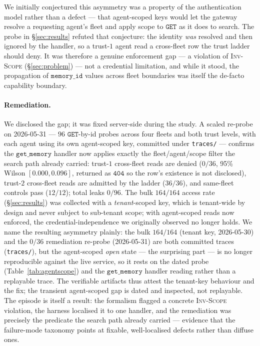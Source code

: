 \documentclass[10pt,twocolumn,letterpaper]{article}
\begin{document}
We initially conjectured this asymmetry was a property of the authentication model rather than a defect --- that agent-scoped keys would let the gateway resolve a requesting agent's fleet and apply scope to \(\mathtt{GET}\) as it does to search. The probe in \S\ref{sec:results} refuted that conjecture: the identity \emph{was} resolved and then ignored by the handler, so a trust-\(1\) agent read a cross-fleet row the trust ladder should deny. It was therefore a genuine enforcement gap --- a violation of \textsc{Inv-Scope} (\S\ref{sec:problem}) --- not a credential limitation, and while it stood, the propagation of \(\mathtt{memory\_id}\) values across fleet boundaries was itself the de-facto capability boundary.

\paragraph{Remediation.} We disclosed the gap; it was fixed server-side during the study. A scaled re-probe on 2026-05-31 --- \(96\) \(\mathtt{GET}\)-by-id probes across four fleets and both trust levels, with each agent using its own agent-scoped key, committed under \texttt{traces/} --- confirms the \(\mathtt{get\_memory}\) handler now applies exactly the fleet/agent/scope filter the search path already carried: trust-\(1\) cross-fleet reads are denied (\(0/36\), 95\% Wilson \([0.000, 0.096]\), returned as \(\mathtt{404}\) so the row's existence is not disclosed), trust-\(2\) cross-fleet reads are admitted by the ladder (\(36/36\)), and same-fleet controls pass (\(12/12\)); total leaks \(0/96\). The bulk \(164/164\) access rate (\S\ref{sec:results}) was collected with a \emph{tenant}-scoped key, which is tenant-wide by design and never subject to sub-tenant scope; with agent-scoped reads now enforced, the credential-independence we originally observed no longer holds. We name the resulting asymmetry plainly: the bulk \(164/164\) (tenant key, 2026-05-30) and the \(0/36\) remediation re-probe (2026-05-31) are both committed traces (\texttt{traces/}), but the agent-scoped \emph{open} state --- the surprising part --- is no longer reproducible against the live service, so it rests on the dated probe (Table~\ref{tab:agentscope}) and the \(\mathtt{get\_memory}\) handler reading rather than a replayable trace. The verifiable artifacts thus attest the tenant-key behaviour and the fix; the transient agent-scoped gap is dated and inspected, not replayable. The episode is itself a result: the formalism flagged a concrete \textsc{Inv-Scope} violation, the harness localised it to one handler, and the remediation was precisely the predicate the search path already carried --- evidence that the failure-mode taxonomy points at fixable, well-localised defects rather than diffuse ones.
\end{document}
